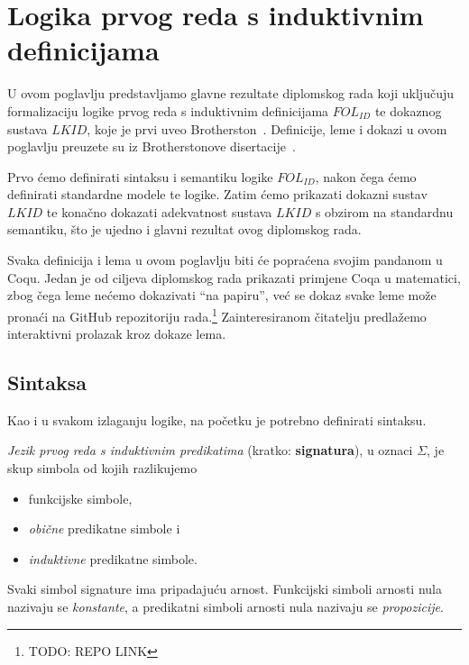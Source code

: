 \chapter{Logika prvog reda s induktivnim definicijama}\label{cha:logika-prvog-reda}
U ovom poglavlju predstavljamo glavne rezultate diplomskog rada koji uključuju formalizaciju
logike prvog reda s induktivnim definicijama \(\mathit{FOL_{ID}}\)
te dokaznog sustava \(\mathit{LKID}\), koje je prvi uveo Brotherston~\cite{brotherston2005}.
Definicije, leme i dokazi u ovom poglavlju preuzete su iz Brotherstonove disertacije~\cite{brotherstonphd}.

Prvo ćemo definirati sintaksu i semantiku logike \(\mathit{FOL_{ID}}\),
nakon čega ćemo definirati standardne modele te logike.
Zatim ćemo prikazati dokazni sustav \(\mathit{LKID}\) te konačno dokazati adekvatnost
sustava \(LKID\) s obzirom na standardnu semantiku,
što je ujedno i glavni rezultat ovog diplomskog rada.

Svaka definicija i lema u ovom poglavlju biti će popraćena svojim pandanom u Coqu.
Jedan je od ciljeva diplomskog rada prikazati primjene Coqa u matematici,
zbog čega leme nećemo dokazivati ``na papiru'',
već se dokaz svake leme može pronaći na GitHub repozitoriju rada.\footnote{TODO: REPO LINK}
Zainteresiranom čitatelju predlažemo interaktivni prolazak kroz dokaze lema.

\section{Sintaksa}\label{sec:sintaksa}
Kao i u svakom izlaganju logike, na početku je potrebno definirati sintaksu.
\begin{definition}
  \textit{Jezik prvog reda s induktivnim predikatima} (kratko: \textbf{signatura}), u oznaci \(\Sigma\),
  je skup simbola od kojih razlikujemo
  \begin{itemize}
  \item funkcijske simbole,
  \item \textit{obične} predikatne simbole i
  \item \textit{induktivne} predikatne simbole.
  \end{itemize}
\end{definition}
\begin{remark}
  Svaki simbol signature ima pripadajuću arnost.
  Funkcijski simboli arnosti nula nazivaju se \textit{konstante},
  a predikatni simboli arnosti nula nazivaju se \textit{propozicije}.
\end{remark}

